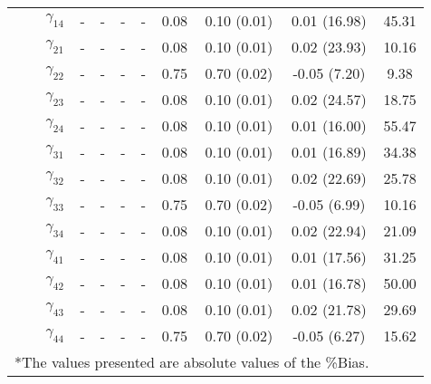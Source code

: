\begin{table}[h]
{\begin{tabular}{ccccccccccc}
 &  & $\gamma_{14}$ & - & - & - & - & 0.08 & 0.10 (0.01) & 0.01 (16.98) & 45.31 \\
 &  & $\gamma_{21}$ & - & - & - & - & 0.08 & 0.10 (0.01) & 0.02 (23.93) & 10.16 \\
 &  & $\gamma_{22}$ & - & - & - & - & 0.75 & 0.70 (0.02) & -0.05 (7.20) & 9.38 \\
 &  & $\gamma_{23}$ & - & - & - & - & 0.08 & 0.10 (0.01) & 0.02 (24.57) & 18.75 \\
 &  & $\gamma_{24}$ & - & - & - & - & 0.08 & 0.10 (0.01) & 0.01 (16.00) & 55.47 \\
 &  & $\gamma_{31}$ & - & - & - & - & 0.08 & 0.10 (0.01) & 0.01 (16.89) & 34.38 \\
 &  & $\gamma_{32}$ & - & - & - & - & 0.08 & 0.10 (0.01) & 0.02 (22.69) & 25.78 \\
 &  & $\gamma_{33}$ & - & - & - & - & 0.75 & 0.70 (0.02) & -0.05 (6.99) & 10.16 \\
 &  & $\gamma_{34}$ & - & - & - & - & 0.08 & 0.10 (0.01) & 0.02 (22.94) & 21.09 \\
 &  & $\gamma_{41}$ & - & - & - & - & 0.08 & 0.10 (0.01) & 0.01 (17.56) & 31.25 \\
 &  & $\gamma_{42}$ & - & - & - & - & 0.08 & 0.10 (0.01) & 0.01 (16.78) & 50.00 \\
 &  & $\gamma_{43}$ & - & - & - & - & 0.08 & 0.10 (0.01) & 0.02 (21.78) & 29.69 \\
 &  & $\gamma_{44}$ & - & - & - & - & 0.75 & 0.70 (0.02) & -0.05 (6.27) & 15.62 \\

\bottomrule
\multicolumn{10}{l}{*The values presented are absolute values of the \%Bias.}
\end{tabular}}
\label{tgr1_2}
\end{table}

